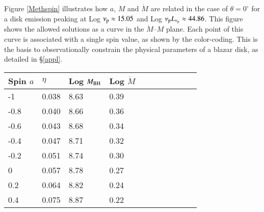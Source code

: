 \documentclass{aa}
\begin{document}
Figure \ref{Methspin} illustrates how $a$, $M$ and $\dot{M}$ are related in the case of $\theta=0^\circ$ for a disk emission peaking at Log $\nu_{\rm p} \approx 15.05$ and Log $\nu_{\rm p} L_{\nu_{\rm p}} \approx 44.86$. This figure shows the allowed solutions as a curve in the $\dot{M}$--$M$ plane. Each point of this curve is associated with a single spin value, as shown by the color-coding. This is the basis to observationally constrain the physical parameters of a blazar disk, as detailed in \S\ref{appl}. 

\begin{table} 
\centering
\footnotesize
\begin{tabular}{lllllllllll}
\hline
Spin $a$ & \hspace{3mm} $\eta$ & \hspace{3mm} Log $M_{\rm BH}$ & \hspace{2mm} Log $\dot{M}$ \\
\hline   
-1	   & \hspace{3mm} 0.038 & \hspace{3mm} 8.63	& \hspace{2mm} 0.39 \\
-0.8   & \hspace{3mm} 0.040 & \hspace{3mm} 8.66	& \hspace{2mm} 0.36 \\
-0.6   & \hspace{3mm} 0.043 & \hspace{3mm} 8.68	& \hspace{2mm} 0.34 \\
-0.4   & \hspace{3mm} 0.047 & \hspace{3mm} 8.71	& \hspace{2mm} 0.32 \\
-0.2   & \hspace{3mm} 0.051 & \hspace{3mm} 8.74	& \hspace{2mm} 0.30 \\
0	   & \hspace{3mm} 0.057 & \hspace{3mm} 8.78	& \hspace{2mm} 0.27 \\
0.2	   & \hspace{3mm} 0.064 & \hspace{3mm} 8.82	& \hspace{2mm} 0.24 \\
0.4	   & \hspace{3mm} 0.075 & \hspace{3mm} 8.87	& \hspace{2mm} 0.22 \\

\end{tabular}
\end{table}
\end{document}
